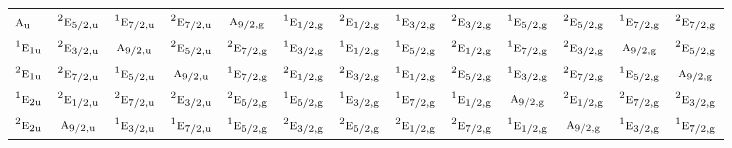 \documentclass[10pt,a4paper]{article}
\numberwithin{equation}{section}
\newcommand{\irr}[1]{\text{\normalfont\scshape #1}}
\newcommand{\conjpair}[1]{{}^{#1}}
\newcommand{\ptag}[1]{\mathrm{#1}}
\begin{document}
{\begin{longtable}{@{}lcccccccccccc@{}}
$\irr{a}_{\ptag{u}}$ & $\conjpair{2}\irr{e}_{5/2,\ptag{u}}$ & $\conjpair{1}\irr{e}_{7/2,\ptag{u}}$ & $\conjpair{2}\irr{e}_{7/2,\ptag{u}}$ & $\irr{a}_{9/2,\ptag{g}}$ & $\conjpair{1}\irr{e}_{1/2,\ptag{g}}$ & $\conjpair{2}\irr{e}_{1/2,\ptag{g}}$ & $\conjpair{1}\irr{e}_{3/2,\ptag{g}}$ & $\conjpair{2}\irr{e}_{3/2,\ptag{g}}$ & $\conjpair{1}\irr{e}_{5/2,\ptag{g}}$ & $\conjpair{2}\irr{e}_{5/2,\ptag{g}}$ & $\conjpair{1}\irr{e}_{7/2,\ptag{g}}$ & $\conjpair{2}\irr{e}_{7/2,\ptag{g}}$\\
$\conjpair{1}\irr{e}_{1\ptag{u}}$ & $\conjpair{2}\irr{e}_{3/2,\ptag{u}}$ & $\irr{a}_{9/2,\ptag{u}}$ & $\conjpair{2}\irr{e}_{5/2,\ptag{u}}$ & $\conjpair{2}\irr{e}_{7/2,\ptag{g}}$ & $\conjpair{1}\irr{e}_{3/2,\ptag{g}}$ & $\conjpair{1}\irr{e}_{1/2,\ptag{g}}$ & $\conjpair{1}\irr{e}_{5/2,\ptag{g}}$ & $\conjpair{2}\irr{e}_{1/2,\ptag{g}}$ & $\conjpair{1}\irr{e}_{7/2,\ptag{g}}$ & $\conjpair{2}\irr{e}_{3/2,\ptag{g}}$ & $\irr{a}_{9/2,\ptag{g}}$ & $\conjpair{2}\irr{e}_{5/2,\ptag{g}}$\\
$\conjpair{2}\irr{e}_{1\ptag{u}}$ & $\conjpair{2}\irr{e}_{7/2,\ptag{u}}$ & $\conjpair{1}\irr{e}_{5/2,\ptag{u}}$ & $\irr{a}_{9/2,\ptag{u}}$ & $\conjpair{1}\irr{e}_{7/2,\ptag{g}}$ & $\conjpair{2}\irr{e}_{1/2,\ptag{g}}$ & $\conjpair{2}\irr{e}_{3/2,\ptag{g}}$ & $\conjpair{1}\irr{e}_{1/2,\ptag{g}}$ & $\conjpair{2}\irr{e}_{5/2,\ptag{g}}$ & $\conjpair{1}\irr{e}_{3/2,\ptag{g}}$ & $\conjpair{2}\irr{e}_{7/2,\ptag{g}}$ & $\conjpair{1}\irr{e}_{5/2,\ptag{g}}$ & $\irr{a}_{9/2,\ptag{g}}$\\
$\conjpair{1}\irr{e}_{2\ptag{u}}$ & $\conjpair{2}\irr{e}_{1/2,\ptag{u}}$ & $\conjpair{2}\irr{e}_{7/2,\ptag{u}}$ & $\conjpair{2}\irr{e}_{3/2,\ptag{u}}$ & $\conjpair{2}\irr{e}_{5/2,\ptag{g}}$ & $\conjpair{1}\irr{e}_{5/2,\ptag{g}}$ & $\conjpair{1}\irr{e}_{3/2,\ptag{g}}$ & $\conjpair{1}\irr{e}_{7/2,\ptag{g}}$ & $\conjpair{1}\irr{e}_{1/2,\ptag{g}}$ & $\irr{a}_{9/2,\ptag{g}}$ & $\conjpair{2}\irr{e}_{1/2,\ptag{g}}$ & $\conjpair{2}\irr{e}_{7/2,\ptag{g}}$ & $\conjpair{2}\irr{e}_{3/2,\ptag{g}}$\\
$\conjpair{2}\irr{e}_{2\ptag{u}}$ & $\irr{a}_{9/2,\ptag{u}}$ & $\conjpair{1}\irr{e}_{3/2,\ptag{u}}$ & $\conjpair{1}\irr{e}_{7/2,\ptag{u}}$ & $\conjpair{1}\irr{e}_{5/2,\ptag{g}}$ & $\conjpair{2}\irr{e}_{3/2,\ptag{g}}$ & $\conjpair{2}\irr{e}_{5/2,\ptag{g}}$ & $\conjpair{2}\irr{e}_{1/2,\ptag{g}}$ & $\conjpair{2}\irr{e}_{7/2,\ptag{g}}$ & $\conjpair{1}\irr{e}_{1/2,\ptag{g}}$ & $\irr{a}_{9/2,\ptag{g}}$ & $\conjpair{1}\irr{e}_{3/2,\ptag{g}}$ & $\conjpair{1}\irr{e}_{7/2,\ptag{g}}$\\

\end{longtable}}
\end{document}
